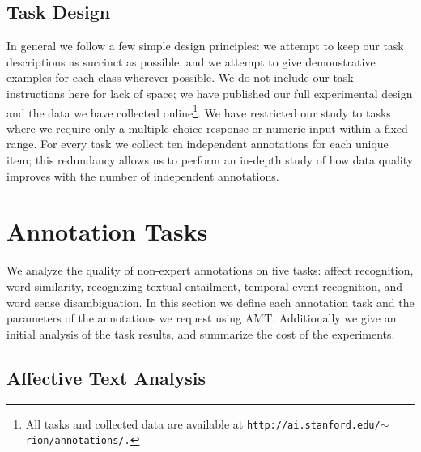 \documentclass[11pt]{article}
\begin{document}
\vspace*{-0.05in}
\subsection{ Task Design }

In general we follow a few simple design principles:  we attempt to keep our task descriptions as succinct as possible, and we attempt to give demonstrative examples for each class wherever possible.  We do not include our task instructions here for lack of space; we have published our full experimental design and the data we have collected online\footnote{All tasks and collected data are available at \texttt{\scriptsize{http://ai.stanford.edu/\ensuremath{\sim}rion/annotations/.}}}.  We have restricted our study to tasks where we require only a multiple-choice response or numeric input within a fixed range. For every task we collect ten independent annotations for each unique item; this redundancy allows us to perform an in-depth study of how data quality improves with the number of independent annotations.


 \vspace*{-0.05in}
\section{ Annotation Tasks }

We analyze the quality of non-expert annotations on five tasks:
affect recognition, word similarity, recognizing textual entailment,
temporal event recognition, and word sense disambiguation. In this
section we define each annotation task and the parameters of the
annotations we request using AMT.  Additionally we give an initial
analysis of the task results, and summarize the cost of the experiments.
\subsection{ Affective Text Analysis }
\end{document}
